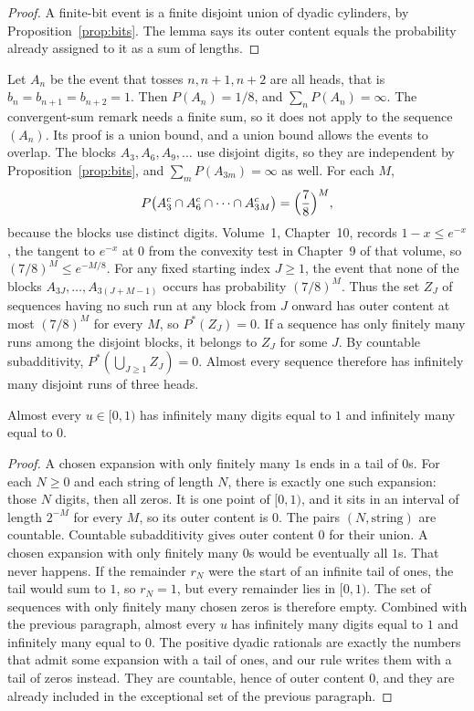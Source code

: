 \begin{proof}
A finite-bit event is a finite disjoint union of dyadic cylinders, by Proposition~\ref{prop:bits}. The lemma says its outer content equals the probability already assigned to it as a sum of lengths.
\end{proof}

\begin{example}\label{ex:run}
Let $A_n$ be the event that tosses $n,n+1,n+2$ are all heads, that is $b_n=b_{n+1}=b_{n+2}=1$. Then $P(A_n)=1/8$, and $\sum_n P(A_n)=\infty$. The convergent-sum remark needs a finite sum, so it does not apply to the sequence $(A_n)$. Its proof is a union bound, and a union bound allows the events to overlap. The blocks $A_{3},A_{6},A_{9},\ldots$ use disjoint digits, so they are independent by Proposition~\ref{prop:bits}, and $\sum_m P(A_{3m})=\infty$ as well. For each $M$,
\[
 P\bigl(A_3^c\cap A_6^c\cap\cdots\cap A_{3M}^c\bigr)=\Bigl(\frac78\Bigr)^M,
\]
because the blocks use distinct digits. Volume~1, Chapter~10, records $1-x\le e^{-x}$, the tangent to $e^{-x}$ at $0$ from the convexity test in Chapter~9 of that volume, so $(7/8)^M\le e^{-M/8}$. For any fixed starting index $J\ge1$, the event that none of the blocks $A_{3J},\ldots,A_{3(J+M-1)}$ occurs has probability $(7/8)^M$. Thus the set $Z_J$ of sequences having no such run at any block from $J$ onward has outer content at most $(7/8)^M$ for every $M$, so $P^*(Z_J)=0$. If a sequence has only finitely many runs among the disjoint blocks, it belongs to $Z_J$ for some $J$. By countable subadditivity, $P^*(\bigcup_{J\ge1}Z_J)=0$. Almost every sequence therefore has infinitely many disjoint runs of three heads.
\end{example}

\begin{proposition}\label{prop:infdigits}
Almost every $u\in[0,1)$ has infinitely many digits equal to $1$ and infinitely many equal to $0$.
\end{proposition}
\begin{proof}
A chosen expansion with only finitely many $1$s ends in a tail of $0$s. For each $N\ge0$ and each string of length $N$, there is exactly one such expansion: those $N$ digits, then all zeros. It is one point of $[0,1)$, and it sits in an interval of length $2^{-M}$ for every $M$, so its outer content is $0$. The pairs $(N,\text{string})$ are countable. Countable subadditivity gives outer content $0$ for their union. A chosen expansion with only finitely many $0$s would be eventually all $1$s. That never happens. If the remainder $r_{N}$ were the start of an infinite tail of ones, the tail would sum to $1$, so $r_N=1$, but every remainder lies in $[0,1)$. The set of sequences with only finitely many chosen zeros is therefore empty. Combined with the previous paragraph, almost every $u$ has infinitely many digits equal to $1$ and infinitely many equal to $0$. The positive dyadic rationals are exactly the numbers that admit some expansion with a tail of ones, and our rule writes them with a tail of zeros instead. They are countable, hence of outer content $0$, and they are already included in the exceptional set of the previous paragraph.
\end{proof}

